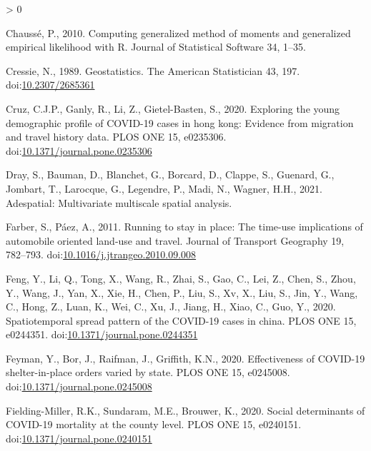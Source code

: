 \documentclass[]{elsarticle} %
\newlength{\cslhangindent}
\newenvironment{CSLReferences}[2] %
 {%
  \setlength{\parindent}{0pt}
  \ifodd #1 \everypar{\setlength{\hangindent}{\cslhangindent}}\ignorespaces\fi
  \ifnum #2 > 0
  \setlength{\parskip}{#2\baselineskip}
  \fi
 }%
 {}
\begin{document}
\begin{CSLReferences}{1}{0}
\leavevmode\hypertarget{ref-gmm2010}{}%
Chaussé, P., 2010. Computing generalized method of moments and
generalized empirical likelihood with {R}. Journal of Statistical
Software 34, 1--35.

\leavevmode\hypertarget{ref-Cressie1989geostatistics}{}%
Cressie, N., 1989. Geostatistics. The American Statistician 43, 197.
doi:\href{https://doi.org/10.2307/2685361}{10.2307/2685361}

\leavevmode\hypertarget{ref-Cruz2020exploring}{}%
Cruz, C.J.P., Ganly, R., Li, Z., Gietel-Basten, S., 2020. Exploring the
young demographic profile of COVID-19 cases in hong kong: Evidence from
migration and travel history data. PLOS ONE 15, e0235306.
doi:\href{https://doi.org/10.1371/journal.pone.0235306}{10.1371/journal.pone.0235306}

\leavevmode\hypertarget{ref-R-adespatial}{}%
Dray, S., Bauman, D., Blanchet, G., Borcard, D., Clappe, S., Guenard,
G., Jombart, T., Larocque, G., Legendre, P., Madi, N., Wagner, H.H.,
2021. Adespatial: Multivariate multiscale spatial analysis.

\leavevmode\hypertarget{ref-Farber2011running}{}%
Farber, S., Páez, A., 2011. Running to stay in place: The time-use
implications of automobile oriented land-use and travel. Journal of
Transport Geography 19, 782--793.
doi:\href{https://doi.org/10.1016/j.jtrangeo.2010.09.008}{10.1016/j.jtrangeo.2010.09.008}

\leavevmode\hypertarget{ref-Feng2020spread}{}%
Feng, Y., Li, Q., Tong, X., Wang, R., Zhai, S., Gao, C., Lei, Z., Chen,
S., Zhou, Y., Wang, J., Yan, X., Xie, H., Chen, P., Liu, S., Xv, X.,
Liu, S., Jin, Y., Wang, C., Hong, Z., Luan, K., Wei, C., Xu, J., Jiang,
H., Xiao, C., Guo, Y., 2020. Spatiotemporal spread pattern of the
COVID-19 cases in china. PLOS ONE 15, e0244351.
doi:\href{https://doi.org/10.1371/journal.pone.0244351}{10.1371/journal.pone.0244351}

\leavevmode\hypertarget{ref-Feyman2020effectiveness}{}%
Feyman, Y., Bor, J., Raifman, J., Griffith, K.N., 2020. Effectiveness of
COVID-19 shelter-in-place orders varied by state. PLOS ONE 15, e0245008.
doi:\href{https://doi.org/10.1371/journal.pone.0245008}{10.1371/journal.pone.0245008}

\leavevmode\hypertarget{ref-Fielding2020social}{}%
Fielding-Miller, R.K., Sundaram, M.E., Brouwer, K., 2020. Social
determinants of COVID-19 mortality at the county level. PLOS ONE 15,
e0240151.
doi:\href{https://doi.org/10.1371/journal.pone.0240151}{10.1371/journal.pone.0240151}


\end{CSLReferences}
\end{document}
